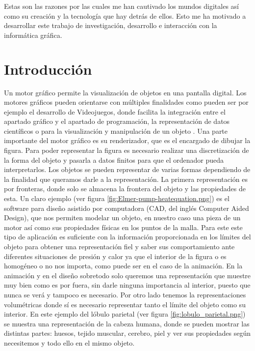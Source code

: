 Estas son las razones por las cuales me han cautivado los mundos digitales así como su creación y la tecnología que hay detrás de ellos. Esto me ha motivado a desarrollar este trabajo de investigación, desarrollo e interacción con la informática gráfica.


\section{ Introducción}

Un motor gráfico permite la visualización de objetos en una pantalla digital. Los motores gráficos pueden orientarse con múltiples finalidades como pueden ser por ejemplo el desarrollo de Videojuegos, donde facilita la integración entre el apartado gráfico y el apartado de programación, la representación de datos científicos o para la visualización y manipulación de un objeto . Una parte importante del motor gráfico es su renderizador, que es el encargado de dibujar la figura. Para poder representar la figura es necesario realizar una discretización de la forma del objeto y pasarla a datos finitos para que el ordenador pueda interpretarlos. Los objetos se pueden representar de varias formas dependiendo de la finalidad que queramos darle a la representación. La primera  representación es por fronteras, donde solo se almacena la frontera del objeto y las propiedades de esta. Un claro ejemplo (ver figura \ref{fig:Elmer-pump-heatequation.png}) es el software para diseño asistido por computadora (CAD, del inglés Computer Aided Design), que nos permiten modelar un objeto, en nuestro caso una pieza de un motor así como sus propiedades físicas en los puntos de la malla. Para este este tipo de aplicación es suficiente con la información proporcionada en los límites del objeto para obtener una representación fiel y saber sus comportamiento ante diferentes situaciones de presión y calor ya que el interior de la figura o es homogéneo o no nos importa, como puede ser en el caso de la animación. En la animación y en el diseño sobretodo solo queremos una representación que muestre muy bien como es por fuera, sin darle ninguna importancia al interior, puesto que nunca se verá y tampoco es necesario. Por otro lado tenemos la representaciones volumétricas donde sí es necesario representar tanto el límite del objeto como su interior. En este ejemplo del lóbulo parietal (ver figura \ref{fig:lobulo_parietal.png}) se muestra una representación de la cabeza humana, donde se pueden mostrar las distintas partes: huesos, tejido muscular, cerebro, piel y ver sus propiedades según necesitemos y todo ello en el mismo objeto.\\

